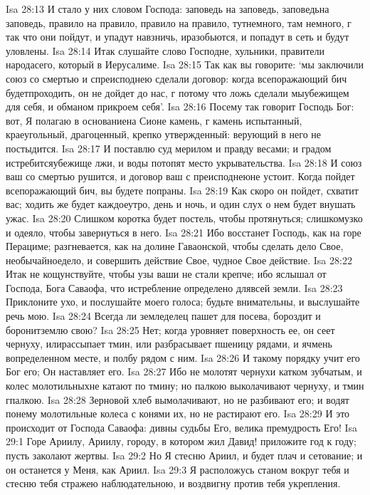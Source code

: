 Isa 28:13  И стало у них словом Господа: заповедь на заповедь, заповедьна заповедь, правило на правило, правило на правило, тутнемного, там немного, г так что они пойдут, и упадут навзничь, иразобьются, и попадут в сеть и будут уловлены.
Isa 28:14  Итак слушайте слово Господне, хульники, правители народасего, который в Иерусалиме.
Isa 28:15  Так как вы говорите: `мы заключили союз со смертью и спреисподнею сделали договор: когда всепоражающий бич будетпроходить, он не дойдет до нас, г потому что ложь сделали мыубежищем для себя, и обманом прикроем себя'.
Isa 28:16  Посему так говорит Господь Бог: вот, Я полагаю в основаниена Сионе камень, г камень испытанный, краеугольный, драгоценный, крепко утвержденный: верующий в него не постыдится.
Isa 28:17  И поставлю суд мерилом и правду весами; и градом истребитсяубежище лжи, и воды потопят место укрывательства.
Isa 28:18  И союз ваш со смертью рушится, и договор ваш с преисподнеюне устоит. Когда пойдет всепоражающий бич, вы будете попраны.
Isa 28:19  Как скоро он пойдет, схватит вас; ходить же будет каждоеутро, день и ночь, и один слух о нем будет внушать ужас.
Isa 28:20  Слишком коротка будет постель, чтобы протянуться; слишкомузко и одеяло, чтобы завернуться в него.
Isa 28:21  Ибо восстанет Господь, как на горе Перациме; разгневается, как на долине Гаваонской, чтобы сделать дело Свое, необычайноедело, и совершить действие Свое, чудное Свое действие.
Isa 28:22  Итак не кощунствуйте, чтобы узы ваши не стали крепче; ибо яслышал от Господа, Бога Саваофа, что истребление определено длявсей земли.
Isa 28:23  Приклоните ухо, и послушайте моего голоса; будьте внимательны, и выслушайте речь мою.
Isa 28:24  Всегда ли земледелец пашет для посева, бороздит и боронитземлю свою?
Isa 28:25  Нет; когда уровняет поверхность ее, он сеет чернуху, илирассыпает тмин, или разбрасывает пшеницу рядами, и ячмень вопределенном месте, и полбу рядом с ним.
Isa 28:26  И такому порядку учит его Бог его; Он наставляет его.
Isa 28:27  Ибо не молотят чернухи катком зубчатым, и колес молотильныхне катают по тмину; но палкою выколачивают чернуху, и тмин гпалкою.
Isa 28:28  Зерновой хлеб вымолачивают, но не разбивают его; и водят понему молотильные колеса с конями их, но не растирают его.
Isa 28:29  И это происходит от Господа Саваофа: дивны судьбы Его, велика премудрость Его!
Isa 29:1  Горе Ариилу, Ариилу, городу, в котором жил Давид! приложите год к году; пусть заколают жертвы.
Isa 29:2  Но Я стесню Ариил, и будет плач и сетование; и он останется у Меня, как Ариил.
Isa 29:3  Я расположусь станом вокруг тебя и стесню тебя стражею наблюдательною, и воздвигну против тебя укрепления.
